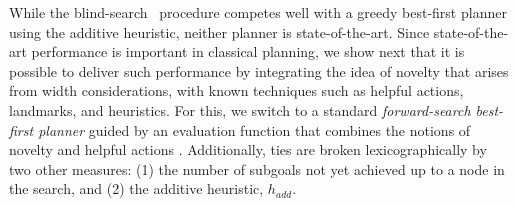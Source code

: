 

While the blind-search \SR\ procedure competes well with a greedy
best-first planner using the additive heuristic, neither planner is
state-of-the-art. Since state-of-the-art performance is important in
classical planning, we show next that it is possible to deliver such
performance by integrating the idea of novelty that arises from width
considerations, with known techniques such as helpful actions,
landmarks, and heuristics. For this, we switch to a standard
\emph{forward-search best-first planner} guided by an evaluation function
that combines the notions of novelty and
helpful actions \cite{nir:ecai12,hoffmann:ff}. Additionally, ties are broken
lexicographically by two other measures:
(1) the number of subgoals not yet achieved up to a node in the search, and
(2) the additive heuristic, $h_{add}$.
